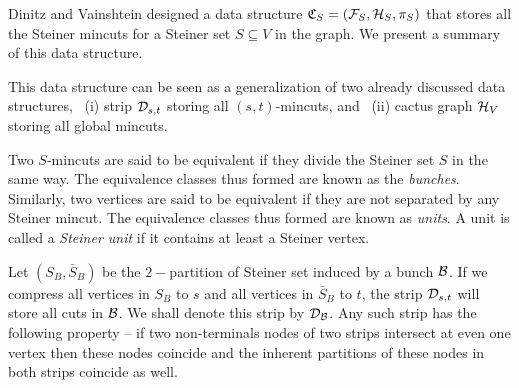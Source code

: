 Dinitz and Vainshtein \cite{DBLP:conf/stoc/DinitzV94} designed a data structure $\mathfrak{C}_S = ({\cal F}_S,{\cal H}_S, \pi_S)$ that stores all the Steiner mincuts for a Steiner set $S\subseteq V$ in the graph. We present a summary of this data structure.

This data structure can be seen as a generalization of two already discussed data structures,
~(i) strip ${\cal D}_{s,t}$ storing all $(s,t)$-mincuts, and
~(ii) cactus graph ${\cal H}_V$ storing all global mincuts.

Two $S$-mincuts are said to be equivalent if they divide the Steiner set $S$ in the same way. The equivalence classes thus formed are known as the \textit{bunches}. Similarly, two vertices are said to be equivalent if they are not separated by any Steiner mincut. The equivalence classes thus formed are known as \textit{units}. A unit is called a \textit{Steiner unit} if it contains at least a Steiner vertex.

Let $(S_B,{\bar S_B})$ be the $2-$partition of Steiner set induced by a bunch $\cal B$. If we compress all vertices in $S_B$ to $s$ and all vertices in ${\bar S_B}$ to $t$, the strip ${\cal D}_{s,t}$ will store all cuts in ${\cal B}$. We shall denote this strip by ${\cal D}_{\cal B}$. Any such strip has the following property -- if two non-terminals nodes of two strips intersect at even one vertex then these nodes coincide and the inherent partitions of these nodes in both strips coincide as well.

